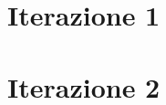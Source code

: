 \documentclass[12pt]{article}   %
\begin{document}
\newpage
\section{Iterazione 1}


\newpage

\newpage

\newpage


\newpage
\section{Iterazione 2}


\newpage
\end{document}
